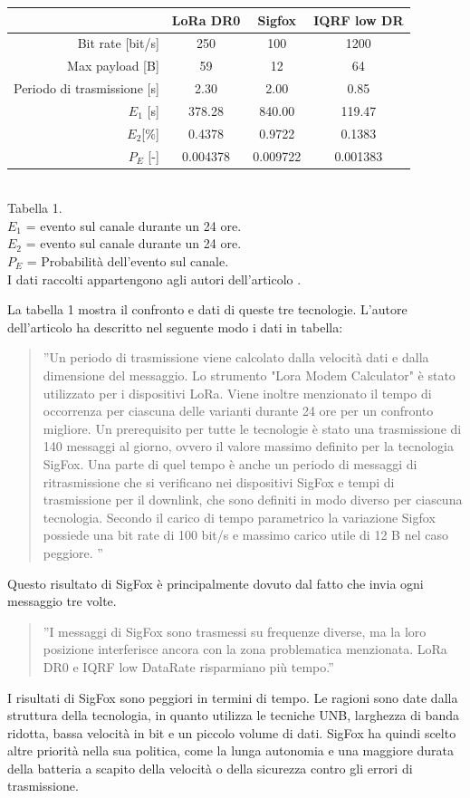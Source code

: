 \documentclass[a4paper]{report} %
\begin{document}
\begin{center}
	\begin{tabular}{r|c|c|c|}
		&LoRa DR0&Sigfox&IQRF low DR\\ \hline
		Bit rate [bit/s]&250&100&1200\\ \hline
		Max payload [B]&59&12&64\\ \hline
		Periodo di trasmissione [s]&2.30&2.00&0.85\\ \hline
		$E_1$ [s]&378.28&840.00&119.47\\ \hline
		$E_2$[\%]&0.4378&0.9722&0.1383\\ \hline
		$P_E$ [-]&0.004378&0.009722&0.001383\\ \hline
	\end{tabular}
	\\ 
	Tabella 1. \\
	$E_1$ = evento sul canale durante un 24 ore. \\
	$E_2$ = evento sul canale durante un 24 ore. \\
	$P_E$ = Probabilità dell'evento sul canale. \\
	I dati raccolti appartengono agli autori dell'articolo \cite{art:rif.46}. \\
	
\end{center}
La tabella 1 mostra il confronto e dati di queste tre tecnologie. L'autore dell'articolo \cite{art:rif.46} ha descritto nel seguente modo i dati in tabella:
\begin{quote}
	''Un periodo di trasmissione viene calcolato dalla velocità dati e dalla dimensione del messaggio. Lo strumento "Lora Modem Calculator" è stato utilizzato per i dispositivi LoRa. Viene inoltre menzionato il tempo di occorrenza per ciascuna delle varianti durante 24 ore per un confronto migliore. Un prerequisito per tutte le tecnologie è stato una trasmissione di 140 messaggi al giorno, ovvero il valore massimo definito per la tecnologia SigFox. Una parte di quel tempo è anche un periodo di messaggi di ritrasmissione che si verificano nei dispositivi SigFox e tempi di trasmissione per il downlink, che sono definiti in modo diverso per ciascuna tecnologia. Secondo il carico di tempo parametrico la variazione Sigfox possiede una bit rate di 100 bit/s e massimo carico utile di 12 B nel caso peggiore. ''
\end{quote}
Questo risultato di SigFox è principalmente dovuto dal fatto che invia ogni messaggio tre volte. 
\begin{quote}
	''I messaggi di SigFox sono trasmessi su frequenze diverse, ma la loro posizione interferisce ancora con la zona problematica menzionata. LoRa DR0 e IQRF low DataRate risparmiano più tempo.''
\end{quote}
I risultati di SigFox sono peggiori in termini di tempo. Le ragioni sono date dalla struttura della tecnologia, in quanto utilizza le tecniche UNB, larghezza di banda ridotta, bassa velocità in bit e un piccolo volume di dati. SigFox ha quindi scelto altre priorità nella sua politica, come la lunga autonomia e una maggiore durata della batteria a scapito della velocità o della sicurezza contro gli errori di trasmissione.
\end{document}

